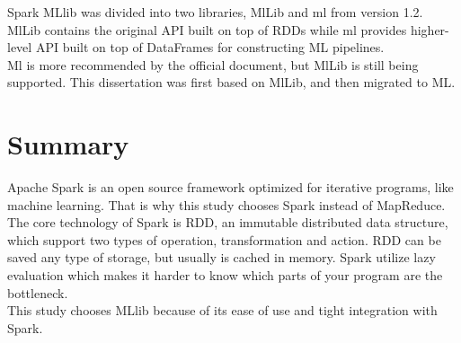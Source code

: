 Spark MLlib was divided into two libraries, MlLib and ml from version 1.2. MlLib contains the original API built on top of RDDs while ml provides higher-level API built on top of DataFrames for constructing ML pipelines.\\


Ml is more recommended by the official document, but MlLib is still being supported. This dissertation was first based on MlLib, and then migrated to ML.


\section{Summary}
Apache Spark is an open source framework optimized for iterative programs, like machine learning. That is why this study chooses Spark instead of MapReduce.\\


The core technology of Spark is RDD, an immutable distributed data structure, which support two types of operation, transformation and action. RDD can be saved any type of storage, but usually is cached in memory. Spark utilize lazy evaluation which makes it harder to know which parts of your program are the bottleneck.\\


This study chooses MLlib because of its ease of use and tight integration with Spark.


